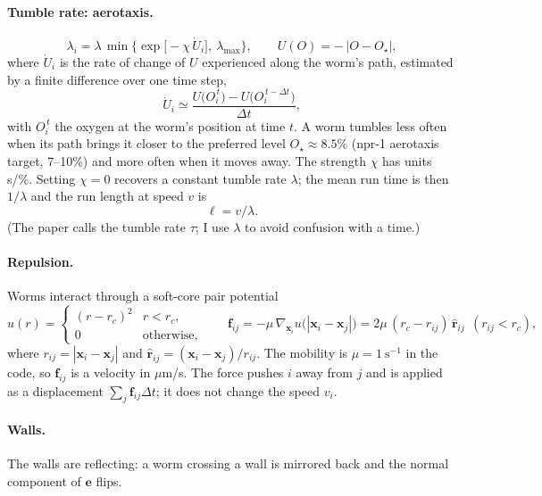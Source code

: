 \documentclass[11pt,a4paper]{article}
\newcommand{\vect}[1]{\bm{#1}}
\newcommand{\Ostar}{O_{\star}}
\begin{document}
\paragraph{Tumble rate: aerotaxis.}
\begin{equation}
\lambda_i=\lambda\,\min\!\Big\{\exp\!\big[-\chi\,\dot U_i\big],\ \lambda_{\max}\Big\},
\qquad
U(O)=-\,|O-\Ostar|,
\label{eq:lam}
\end{equation}
where $\dot U_i$ is the rate of change of $U$ experienced along the worm's path, estimated by a finite difference over one time step,
\begin{equation}
\dot U_i\simeq\frac{U\big(O_i^{\,t}\big)-U\big(O_i^{\,t-\Delta t}\big)}{\Delta t},
\end{equation}
with $O_i^{\,t}$ the oxygen at the worm's position at time $t$. A worm tumbles less often when its path brings it closer to the preferred level $\Ostar\approx 8.5\%$ (npr-1 aerotaxis target, 7--10\%) and more often when it moves away. The strength $\chi$ has units s/\%. Setting $\chi=0$ recovers a constant tumble rate $\lambda$; the mean run time is then $1/\lambda$ and the run length at speed $v$ is
\begin{equation}
\ell=v/\lambda .
\end{equation}
(The paper calls the tumble rate $\tau$; I use $\lambda$ to avoid confusion with a time.)

\paragraph{Repulsion.}
Worms interact through a soft-core pair potential
\begin{equation}
u(r)=\begin{cases}(r-r_c)^2 & r<r_c,\\ 0 & \text{otherwise,}\end{cases}
\qquad
\vect{f}_{ij}=-\mu\,\nabla_{\vect{x}_i}u\big(|\vect{x}_i-\vect{x}_j|\big)=2\mu\,(r_c-r_{ij})\,\hat{\vect{r}}_{ij}\ \ (r_{ij}<r_c),
\label{eq:pot}
\end{equation}
where $r_{ij}=|\vect{x}_i-\vect{x}_j|$ and $\hat{\vect{r}}_{ij}=(\vect{x}_i-\vect{x}_j)/r_{ij}$. The mobility is $\mu=1~\mathrm{s}^{-1}$ in the code, so $\vect{f}_{ij}$ is a velocity in $\mu$m/s. The force pushes $i$ away from $j$ and is applied as a displacement $\sum_j\vect{f}_{ij}\Delta t$; it does not change the speed $v_i$.

\paragraph{Walls.} The walls are reflecting: a worm crossing a wall is mirrored back and the normal component of $\vect{e}$ flips.
\end{document}

